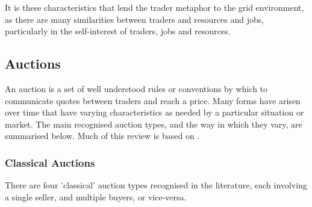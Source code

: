 It is these characteristics that lend the trader metaphor to the grid
environment, as there are many similarities between traders and resources and
jobs, particularly in the self-interest of traders, jobs and resources.



\subsection{Auctions}
\label{SEC:ECON:AUCTIONS}

An auction is a set of well understood rules or conventions by which to
communicate quotes between traders and reach a price. Many forms have arisen
over time that have varying characteristics as needed by a particular situation
or market. The main recognised auction types, and the way in which they vary,
are summarised below. Much of this review is based on
\cite{eco-klemperer99-auction}.

\subsubsection{Classical Auctions}

There are four 'classical' auction types recognised in the literature, each
involving a single seller, and multiple buyers, or vice-versa.

